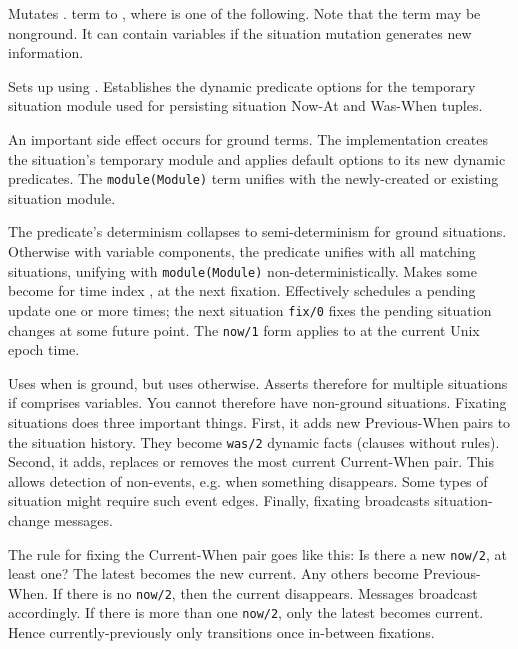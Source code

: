 \begin{description}
Mutates .  term to , where  is one of
the following. Note that the  term may be nonground. It can
contain variables if the situation mutation generates new
information.

\begin{description}
Sets up  using . Establishes the dynamic
predicate options for the temporary situation module used for
persisting situation Now-At and Was-When tuples.

An important side effect occurs for ground  terms. The
implementation creates the situation's temporary module and
applies default options to its new dynamic predicates. The
\verb$module(Module)$ term unifies with the newly-created or existing
situation module.

The predicate's determinism collapses to semi-determinism for
ground situations. Otherwise with variable  components,
the predicate unifies with all matching situations, unifying
with \verb$module(Module)$ non-deterministically.
Makes some  become  for time index , at the next
fixation. Effectively schedules a pending update one or more
times; the next situation \verb$fix/0$ fixes the pending situation
changes at some future point. The \verb$now/1$ form applies  to
 at the current Unix epoch time.

Uses  when  is ground, but
uses  otherwise. Asserts therefore
for multiple situations if  comprises variables. You
cannot therefore have non-ground situations.
Fixating situations does three important things. First, it adds
new Previous-When pairs to the situation history. They become
\verb$was/2$ dynamic facts (clauses without rules). Second, it adds,
replaces or removes the most current Current-When pair. This
allows detection of non-events, e.g. when something disappears.
Some types of situation might require such event edges. Finally,
fixating broadcasts situation-change messages.

The rule for fixing the Current-When pair goes like this: Is
there a new \verb$now/2$, at least one? The latest becomes the new
current. Any others become Previous-When. If there is no
\verb$now/2$, then the current disappears. Messages broadcast
accordingly. If there is more than one \verb$now/2$, only the latest
becomes current. Hence currently-previously only transitions
once in-between fixations.


\end{description}
\end{description}
